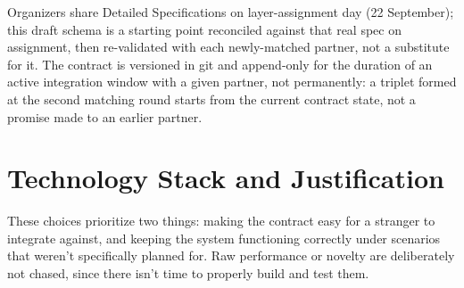 \documentclass[10pt,letterpaper]{article}
\begin{document}
Organizers share Detailed Specifications on layer-assignment day (22 September); this draft schema is a starting point reconciled against that real spec on assignment, then re-validated with each newly-matched partner, not a substitute for it. The contract is versioned in git and append-only for the duration of an active integration window with a given partner, not permanently: a triplet formed at the second matching round starts from the current contract state, not a promise made to an earlier partner.

\section{Technology Stack and Justification}

These choices prioritize two things: making the contract easy for a stranger to integrate against, and keeping the system functioning correctly under scenarios that weren't specifically planned for. Raw performance or novelty are deliberately not chased, since there isn't time to properly build and test them.
\end{document}
